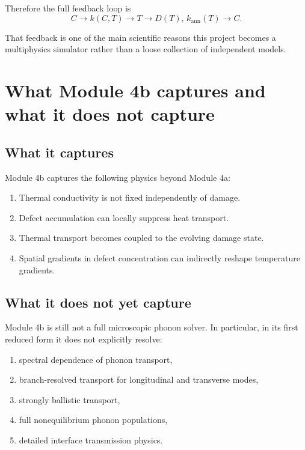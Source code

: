 \documentclass[11pt]{article}
\begin{document}
Therefore the full feedback loop is
\begin{equation}
 C \longrightarrow k(C,T) \longrightarrow T \longrightarrow D(T),\, k_{\mathrm{ann}}(T) \longrightarrow C.
\end{equation}

That feedback is one of the main scientific reasons this project becomes a multiphysics simulator rather than a loose collection of independent models.

\section{What Module 4b captures and what it does not capture}

\subsection{What it captures}

Module 4b captures the following physics beyond Module 4a:
\begin{enumerate}[label=\arabic*.]
    \item Thermal conductivity is not fixed independently of damage.
    \item Defect accumulation can locally suppress heat transport.
    \item Thermal transport becomes coupled to the evolving damage state.
    \item Spatial gradients in defect concentration can indirectly reshape temperature gradients.
\end{enumerate}

\subsection{What it does not yet capture}

Module 4b is still not a full microscopic phonon solver. In particular, in its first reduced form it does not explicitly resolve:
\begin{enumerate}[label=\arabic*.]
    \item spectral dependence of phonon transport,
    \item branch-resolved transport for longitudinal and transverse modes,
    \item strongly ballistic transport,
    \item full nonequilibrium phonon populations,
    \item detailed interface transmission physics.
\end{enumerate}
\end{document}
